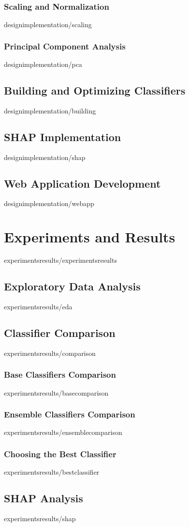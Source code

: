 \documentclass[covers, firstnumbered, tfg, extendedindex, epsbased, english, final]{tfgtfmthesisuam}
\begin{document}
\subsection{Scaling and Normalization}{designimplementation/scaling}
\subsection{Principal Component Analysis}{designimplementation/pca}
\section{Building and Optimizing Classifiers}{designimplementation/building}
\section{SHAP Implementation}{designimplementation/shap}
\section{Web Application Development}{designimplementation/webapp}

\chapter{Experiments and Results\label{SEC:RESULTS}}{experimentsresults/experimentsresults}
\section{Exploratory Data Analysis}{experimentsresults/eda}
\section{Classifier Comparison}{experimentsresults/comparison}
\subsection{Base Classifiers Comparison}{experimentsresults/basecomparison}
\subsection{Ensemble Classifiers Comparison}{experimentsresults/ensemblecomparison}
\subsection{Choosing the Best Classifier}{experimentsresults/bestclassifier}
\section{SHAP Analysis}{experimentsresults/shap}
\end{document}
